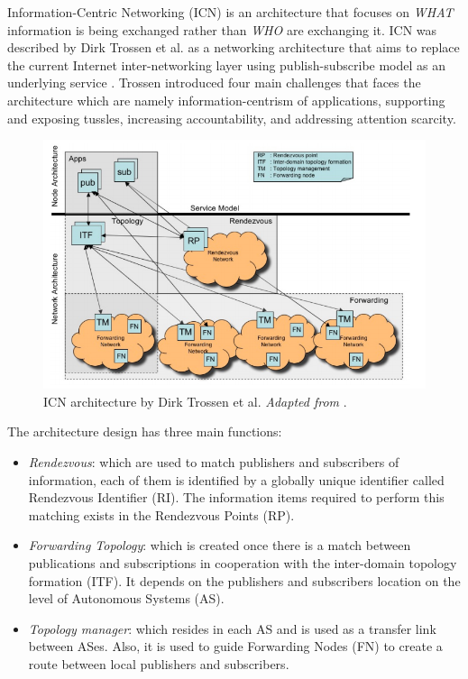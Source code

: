 Information-Centric Networking (ICN) is an architecture that focuses on \textit{WHAT} information is being exchanged rather than \textit{WHO} are exchanging it. ICN was described by Dirk Trossen et al. as a networking architecture that aims to replace the current Internet inter-networking layer using publish-subscribe model as an underlying service \cite{Trossen:2010:AII:1764873.1764878}. Trossen introduced four main challenges that faces the architecture which are namely information-centrism of applications, supporting and exposing tussles, increasing accountability, and addressing attention scarcity.
\begin{figure}[H]
	\centering
	\includegraphics[scale=0.4]{images/trossen.png}
	\caption{ICN architecture by Dirk Trossen et al. \textit{Adapted from } \cite{Trossen:2010:AII:1764873.1764878}.}
	\label{fig:trossen}
\end{figure}

\noindent The architecture  design has three main functions:
\begin{itemize}
\item \textit{Rendezvous}: which are used to match  publishers and subscribers of information, each of them is identified by a globally unique identifier called Rendezvous Identifier (RI). The information items required to perform this matching exists in the Rendezvous Points (RP).
\item \textit{Forwarding Topology}: which is created once there is a match between publications and subscriptions in cooperation with the inter-domain topology formation (ITF). It depends on the publishers and subscribers location on the level of Autonomous Systems (AS).
\item \textit{Topology manager}: which resides in each AS and is used as a transfer link between ASes. Also, it is used to guide Forwarding Nodes (FN) to create a route between local publishers and subscribers.
\end{itemize}


